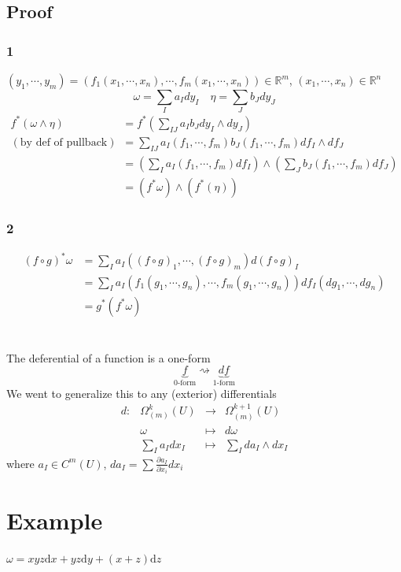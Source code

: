 \documentclass{book}
\begin{document}
\subsection*{Proof}
\subsubsection{1}
$(y_1,\cdots,y_m)=(f_1(x_1,\cdots,x_n),\cdots,f_m(x_1,\cdots,x_n))\in \mathbb{R}^m$, $(x_1,\cdots,x_n)\in \mathbb{R}^n$
$$\omega=\sum\limits_Ia_Idy_I\quad\eta=\sum\limits_Jb_Jdy_J$$
$$\begin{aligned}
    f^*(\omega\wedge\eta) &=f^*(\sum\limits_{IJ}a_Ib_Jdy_I\wedge dy_J)\\ (\text{by def of pullback})&=\sum\limits_{IJ}a_I(f_1,\cdots,f_m)b_J(f_1,\cdots,f_m)df_I\wedge df_J\\
    &=(\sum\limits_{I}a_I(f_1,\cdots,f_m)df_I)\wedge(\sum\limits_{J}b_J(f_1,\cdots,f_m)df_J)\\ &=(f^*\omega)\wedge(f^*(\eta))
\end{aligned}$$
\subsubsection{2}
$$\begin{aligned}
    (f\circ g)^*\omega &=\sum\limits_Ia_I((f\circ g)_1,\cdots,(f\circ g)_m)d(f\circ g)_I\\
    &=\sum\limits_Ia_I(f_1(g_1,\cdots,g_n),\cdots,f_m(g_1,\cdots,g_n))df_I(dg_1,\cdots,dg_n)\\ &=g^*(f^*\omega)
\end{aligned}$$
\section{}
The deferential of a function is a one-form
$$\underbrace{f}\limits_{\text{0-form}}\rightsquigarrow \underbrace{df}\limits_{\text{1-form}}$$
We went to generalize this to any (exterior) differentials
$$\begin{aligned}
    d: &\Omega^k_{(m)}(U) &\rightarrow &\Omega^{k+1}_{(m)}(U)\\
    &\omega &\mapsto &d\omega\\
    &\sum\limits_Ia_Idx_I&\mapsto &\sum\limits_Ida_I\wedge dx_I
\end{aligned}$$
where $a_I\in C^m(U)$, $da_I=\sum\frac{\partial a_I}{\partial x_i}dx_i$
\section{Example}
$\omega=xyz\text{d}x+yz\text{d}y+(x+z)\text{d}z$
\end{document}
